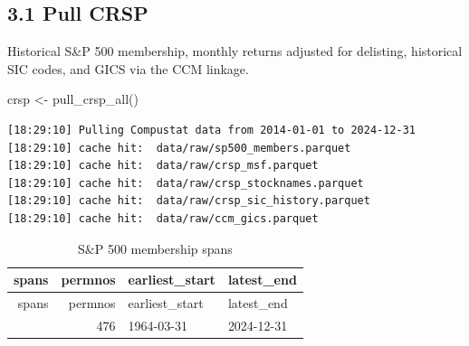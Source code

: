 \documentclass[
  letterpaper,
  DIV=11,
  numbers=noendperiod]{scrartcl}
\newenvironment{Shaded}{\begin{snugshade}}{\end{snugshade}}
\newcommand{\AttributeTok}[1]{\textcolor[rgb]{0.40,0.45,0.13}{#1}}
\newcommand{\FunctionTok}[1]{\textcolor[rgb]{0.28,0.35,0.67}{#1}}
\newcommand{\NormalTok}[1]{\textcolor[rgb]{0.00,0.23,0.31}{#1}}
\newcommand{\OtherTok}[1]{\textcolor[rgb]{0.00,0.23,0.31}{#1}}
\newcommand{\SpecialCharTok}[1]{\textcolor[rgb]{0.37,0.37,0.37}{#1}}
\newcommand{\StringTok}[1]{\textcolor[rgb]{0.13,0.47,0.30}{#1}}
\begin{document}
\subsection{3.1 Pull CRSP}\label{pull-crsp}

Historical S\&P 500 membership, monthly returns adjusted for delisting,
historical SIC codes, and GICS via the CCM linkage.

\begin{Shaded}
\begin{Highlighting}[]
\NormalTok{crsp }\OtherTok{\textless{}{-}} \FunctionTok{pull\_crsp\_all}\NormalTok{()}
\end{Highlighting}
\end{Shaded}

\begin{verbatim}
[18:29:10] Pulling Compustat data from 2014-01-01 to 2024-12-31
[18:29:10] cache hit:  data/raw/sp500_members.parquet
[18:29:10] cache hit:  data/raw/crsp_msf.parquet
[18:29:10] cache hit:  data/raw/crsp_stocknames.parquet
[18:29:10] cache hit:  data/raw/crsp_sic_history.parquet
[18:29:10] cache hit:  data/raw/ccm_gics.parquet
\end{verbatim}

\begin{Shaded}
\end{Shaded}

\begin{longtable}[]{@{}rrll@{}}
\caption{S\&P 500 membership spans}\tabularnewline
\toprule\noalign{}
spans & permnos & earliest\_start & latest\_end \\
\midrule\noalign{}
\endfirsthead
\toprule\noalign{}
spans & permnos & earliest\_start & latest\_end \\
\midrule\noalign{}
\endhead
\bottomrule\noalign{}
\endlastfoot
476 & 476 & 1964-03-31 & 2024-12-31 \\
\end{longtable}
\end{document}

